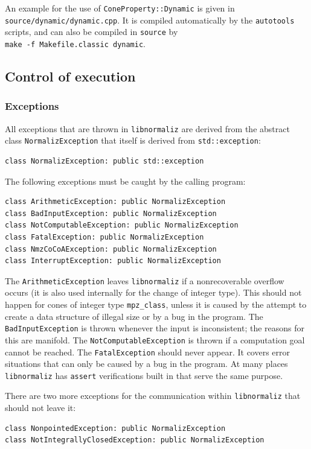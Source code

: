\begin{small}
An example for the use of \verb|ConeProperty::Dynamic| is given in \verb|source/dynamic/dynamic.cpp|. It is compiled automatically by the \verb|autotools| scripts, and can also be compiled in \verb|source| by\\ \verb|make -f Makefile.classic dynamic|.

\subsection{Control of execution}

\subsubsection{Exceptions}

All exceptions that are thrown in \verb|libnormaliz| are derived from the abstract class \verb|NormalizException| that itself is derived from \verb|std::exception|:
\begin{Verbatim}
class NormalizException: public std::exception
\end{Verbatim}

The following exceptions must be caught by the calling program:
\begin{Verbatim}
class ArithmeticException: public NormalizException
class BadInputException: public NormalizException
class NotComputableException: public NormalizException
class FatalException: public NormalizException
class NmzCoCoAException: public NormalizException
class InterruptException: public NormalizException
\end{Verbatim}

The \verb|ArithmeticException| leaves \verb|libnormaliz| if a nonrecoverable overflow occurs (it is also used internally for the change of integer type). This should not happen for cones of integer type \verb|mpz_class|, unless it is caused by the attempt to create a data structure of illegal size or by a bug in the program. The \verb|BadInputException| is thrown whenever the input is inconsistent; the reasons for this are manifold. The \verb|NotComputableException| is thrown if a computation goal cannot be reached. The \verb|FatalException| should never appear. It covers error situations that can only be caused by a bug in the program. At many places \verb|libnormaliz| has \verb|assert| verifications built in that serve the same purpose.

There are two more exceptions for the communication within \verb|libnormaliz| that should not leave it:
\begin{Verbatim}
class NonpointedException: public NormalizException 
class NotIntegrallyClosedException: public NormalizException
\end{Verbatim}


\end{small}
